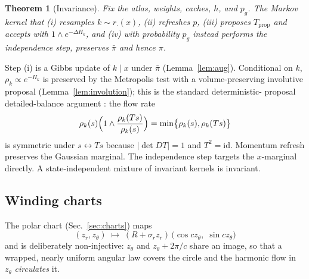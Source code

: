 \documentclass[10pt,journal,compsoc]{IEEEtran}
\newtheorem{theorem}{Theorem}
\begin{document}
\begin{theorem}[Invariance]\label{thm:exact}
Fix the atlas, weights, caches, $h$, and $p_g$. The Markov kernel that (i)
resamples $k\sim r_\cdot(x)$, (ii) refreshes $p$, (iii) proposes
$T_{\mathrm{prop}}$ and accepts with
$1\wedge e^{-\Delta H_k}$, and (iv) with probability $p_g$ instead performs
the independence step, preserves $\bar\pi$ and hence $\pi$.
\end{theorem}
\begin{IEEEproof}
Step (i) is a Gibbs update of $k\mid x$ under $\bar\pi$
(Lemma~\ref{lem:aug}). Conditional on $k$, $\rho_k\propto e^{-H_k}$ is
preserved by the Metropolis test with a volume-preserving involutive
proposal (Lemma~\ref{lem:involution}); this is the standard deterministic-%
proposal detailed-balance argument \cite{tierney1994,neklyudov2020}: the
flow rate
\begin{equation}
\rho_k(s)\Bigl(1\wedge\frac{\rho_k(Ts)}{\rho_k(s)}\Bigr)
=\min\bigl\{\rho_k(s),\rho_k(Ts)\bigr\}\notag
\end{equation}
is symmetric under $s\leftrightarrow Ts$ because $|\det DT|=1$ and
$T^2=\mathrm{id}$.
Momentum refresh preserves the Gaussian marginal. The independence step
targets the $x$-marginal directly. A state-independent mixture of invariant
kernels is invariant.
\end{IEEEproof}

\subsection{Winding charts}\label{sec:winding}
The polar chart (Sec.~\ref{sec:charts}) maps
\begin{equation}
(z_r,z_\theta)\;\mapsto\;
(R+\sigma_rz_r)\,\bigl(\cos cz_\theta,\;\sin cz_\theta\bigr)
\label{eq:polar}
\end{equation}
and is deliberately non-injective:
$z_\theta$ and $z_\theta+2\pi/c$ share an image, so that a wrapped, nearly
uniform angular law covers the circle and the harmonic flow in $z_\theta$
\emph{circulates} it.
\end{document}
